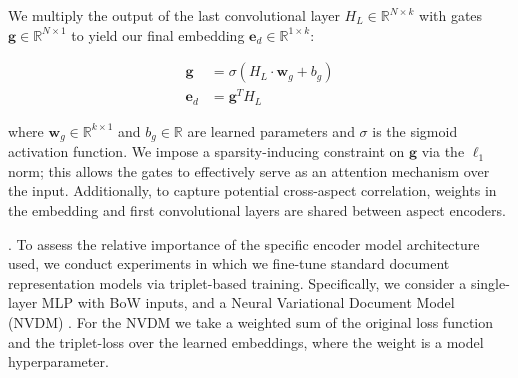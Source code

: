 \documentclass[11pt,a4paper]{article}
\begin{document}
We multiply the output of the last convolutional layer $H_L \in \mathbb{R}^{N \times k}$ with gates ${\mathbf g} \in \mathbb{R}^{N \times 1}$ to yield our final embedding ${\mathbf e_d} \in \mathbb{R}^{1 \times k}$: %

\begin{equation}
\begin{aligned}
{\mathbf g} &= \sigma(H_L \cdot {\mathbf w}_g + b_g) \\
{\mathbf e_d} &= {\mathbf g}^T H_L
\end{aligned}
\label{eq:gate}
\end{equation}




\noindent where ${\mathbf w}_g \in \mathbb{R}^{k \times 1}$ and $b_g \in \mathbb{R}$ are learned parameters and $\sigma$ is the sigmoid activation function. We impose a sparsity-inducing constraint on $\mathbf{g}$ via the $\ell_1$ norm; this allows the gates to effectively serve as an attention mechanism over the input. Additionally, to capture potential cross-aspect correlation, weights in the embedding and first convolutional layers are shared between aspect encoders. 




\vspace{.2em}
. To assess the relative importance of the specific encoder model architecture used, we conduct experiments in which we fine-tune standard document representation models via triplet-based training. Specifically, we consider a single-layer MLP with BoW inputs, and a Neural Variational Document Model (NVDM) \cite{miao2016neural}. For the NVDM we take a weighted sum of the original loss function and the triplet-loss over the learned embeddings, where the weight is a model hyperparameter.
\end{document}
